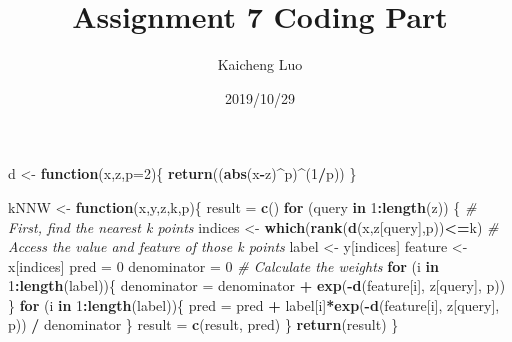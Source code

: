 \documentclass[]{article}
\title{Assignment 7 Coding Part}
\author{Kaicheng Luo}
\date{2019/10/29}
\newenvironment{Shaded}{\begin{snugshade}}{\end{snugshade}}
\newcommand{\KeywordTok}[1]{\textcolor[rgb]{0.13,0.29,0.53}{\textbf{#1}}}
\newcommand{\DataTypeTok}[1]{\textcolor[rgb]{0.13,0.29,0.53}{#1}}
\newcommand{\DecValTok}[1]{\textcolor[rgb]{0.00,0.00,0.81}{#1}}
\newcommand{\StringTok}[1]{\textcolor[rgb]{0.31,0.60,0.02}{#1}}
\newcommand{\CommentTok}[1]{\textcolor[rgb]{0.56,0.35,0.01}{\textit{#1}}}
\newcommand{\ControlFlowTok}[1]{\textcolor[rgb]{0.13,0.29,0.53}{\textbf{#1}}}
\newcommand{\OperatorTok}[1]{\textcolor[rgb]{0.81,0.36,0.00}{\textbf{#1}}}
\newcommand{\NormalTok}[1]{#1}
\begin{document}
\maketitle

\begin{Shaded}
\begin{Highlighting}[]
\NormalTok{d <-}\StringTok{ }\ControlFlowTok{function}\NormalTok{(x,z,}\DataTypeTok{p=}\DecValTok{2}\NormalTok{)\{}
  \KeywordTok{return}\NormalTok{((}\KeywordTok{abs}\NormalTok{(x}\OperatorTok{-}\NormalTok{z)}\OperatorTok{^}\NormalTok{p)}\OperatorTok{^}\NormalTok{(}\DecValTok{1}\OperatorTok{/}\NormalTok{p))}
\NormalTok{\}}

\NormalTok{kNNW <-}\StringTok{ }\ControlFlowTok{function}\NormalTok{(x,y,z,k,p)\{}
\NormalTok{  result =}\StringTok{ }\KeywordTok{c}\NormalTok{()}
  \ControlFlowTok{for}\NormalTok{ (query }\ControlFlowTok{in} \DecValTok{1}\OperatorTok{:}\KeywordTok{length}\NormalTok{(z))}
\NormalTok{  \{}
    \CommentTok{# First, find the nearest k points}
\NormalTok{    indices <-}\StringTok{ }\KeywordTok{which}\NormalTok{(}\KeywordTok{rank}\NormalTok{(}\KeywordTok{d}\NormalTok{(x,z[query],p))}\OperatorTok{<=}\NormalTok{k)}
    \CommentTok{# Access the value and feature of those k points}
\NormalTok{    label <-}\StringTok{ }\NormalTok{y[indices]}
\NormalTok{    feature <-}\StringTok{ }\NormalTok{x[indices]}
\NormalTok{    pred =}\StringTok{ }\DecValTok{0}
\NormalTok{    denominator =}\StringTok{ }\DecValTok{0}
    \CommentTok{# Calculate the weights}
    \ControlFlowTok{for}\NormalTok{ (i }\ControlFlowTok{in} \DecValTok{1}\OperatorTok{:}\KeywordTok{length}\NormalTok{(label))\{}
\NormalTok{      denominator =}\StringTok{ }\NormalTok{denominator }\OperatorTok{+}\StringTok{ }\KeywordTok{exp}\NormalTok{(}\OperatorTok{-}\KeywordTok{d}\NormalTok{(feature[i], z[query], p))}
\NormalTok{    \}}
    \ControlFlowTok{for}\NormalTok{ (i }\ControlFlowTok{in} \DecValTok{1}\OperatorTok{:}\KeywordTok{length}\NormalTok{(label))\{}
\NormalTok{      pred =}\StringTok{ }\NormalTok{pred }\OperatorTok{+}\StringTok{ }\NormalTok{label[i]}\OperatorTok{*}\KeywordTok{exp}\NormalTok{(}\OperatorTok{-}\KeywordTok{d}\NormalTok{(feature[i], z[query], p)) }\OperatorTok{/}\StringTok{ }\NormalTok{denominator}
\NormalTok{    \}}
\NormalTok{    result =}\StringTok{ }\KeywordTok{c}\NormalTok{(result, pred)}
\NormalTok{  \}}
  \KeywordTok{return}\NormalTok{(result)}
\NormalTok{\}}


\end{Highlighting}
\end{Shaded}
\end{document}
